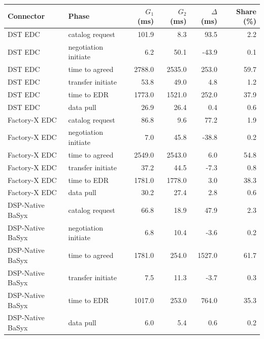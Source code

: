 \begin{tabular}{llrrrr}
    \toprule
    Connector & Phase & $G_1$ (ms) & $G_2$ (ms) & $\Delta$ (ms) & Share (\%) \\
    \midrule
    DST EDC & catalog request & 101.9 & 8.3 & 93.5 & 2.2 \\
    DST EDC & negotiation initiate & 6.2 & 50.1 & -43.9 & 0.1 \\
    DST EDC & time to agreed & 2788.0 & 2535.0 & 253.0 & 59.7 \\
    DST EDC & transfer initiate & 53.8 & 49.0 & 4.8 & 1.2 \\
    DST EDC & time to EDR & 1773.0 & 1521.0 & 252.0 & 37.9 \\
    DST EDC & data pull & 26.9 & 26.4 & 0.4 & 0.6 \\
    Factory-X EDC & catalog request & 86.8 & 9.6 & 77.2 & 1.9 \\
    Factory-X EDC & negotiation initiate & 7.0 & 45.8 & -38.8 & 0.2 \\
    Factory-X EDC & time to agreed & 2549.0 & 2543.0 & 6.0 & 54.8 \\
    Factory-X EDC & transfer initiate & 37.2 & 44.5 & -7.3 & 0.8 \\
    Factory-X EDC & time to EDR & 1781.0 & 1778.0 & 3.0 & 38.3 \\
    Factory-X EDC & data pull & 30.2 & 27.4 & 2.8 & 0.6 \\
    DSP-Native BaSyx & catalog request & 66.8 & 18.9 & 47.9 & 2.3 \\
    DSP-Native BaSyx & negotiation initiate & 6.8 & 10.4 & -3.6 & 0.2 \\
    DSP-Native BaSyx & time to agreed & 1781.0 & 254.0 & 1527.0 & 61.7 \\
    DSP-Native BaSyx & transfer initiate & 7.5 & 11.3 & -3.7 & 0.3 \\
    DSP-Native BaSyx & time to EDR & 1017.0 & 253.0 & 764.0 & 35.3 \\
    DSP-Native BaSyx & data pull & 6.0 & 5.4 & 0.6 & 0.2 \\
    \bottomrule
\end{tabular}
